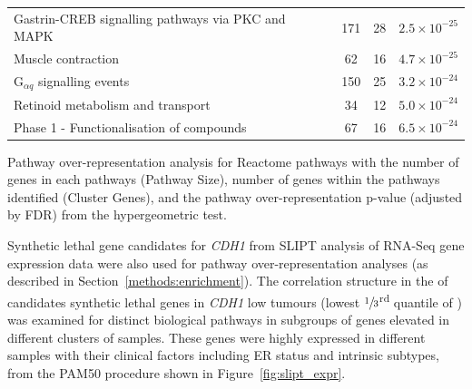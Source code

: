 \begin{table}[!ht]
{\begin{threeparttable}
\begin{tabular}{lccc}
  \rowcolor{Cluster_Red!15} 
  Gastrin-CREB signalling \glspl{pathway} via PKC and MAPK & 171 &  28 & $2.5 \times 10^{-25}$ \\
  \rowcolor{Cluster_Red!20} 
  Muscle contraction &  62 &  16 & $4.7 \times 10^{-25}$ \\
  \rowcolor{Cluster_Red!15} 
  G$_{\alpha q}$ signalling events & 150 &  25 & $3.2 \times 10^{-24}$ \\
  \rowcolor{Cluster_Red!20} 
  Retinoid metabolism and transport &  34 &  12 & $5.0 \times 10^{-24}$ \\
  \rowcolor{Cluster_Red!15} 
  Phase 1 - Functionalisation of compounds &  67 &  16 & $6.5 \times 10^{-24}$ \\
  \hline
\end{tabular}
\begin{tablenotes}
\raggedright %
Pathway over-representation analysis for Reactome \glspl{pathway} with the number of genes in each \glspl{pathway} (Pathway Size), number of genes within the \glspl{pathway} identified (Cluster Genes), and the \gls{pathway} over-representation p-value (adjusted by \gls{FDR}) from the hypergeometric test.  
\end{tablenotes}
\end{threeparttable}
}
\end{table}

Synthetic lethal gene candidates for \textit{CDH1} from \gls{SLIPT} analysis of \gls{RNA-Seq} \gls{gene expression} data were also used for \gls{pathway} over-representation analyses (as described in Section~\ref{methods:enrichment}). The correlation structure in the  of candidates \gls{synthetic lethal} genes in \textit{CDH1} low tumours (lowest $\sfrac{1}{3}$\textsuperscript{rd} quantile of ) was examined for distinct biological \glspl{pathway} in subgroups of genes elevated in different clusters of samples. These genes were highly expressed in different samples with their clinical factors including \gls{ER} status and \glspl{intrinsic subtype}, from the \gls{PAM50} procedure \citep{Parker2009} shown in Figure~\ref{fig:slipt_expr}.

